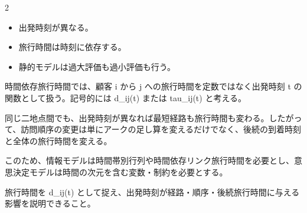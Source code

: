 \clearpage



\vspace{1.5mm}

\begin{multicols}{2}

\footnotesize

\raggedcolumns


\begin{itemize}
\item 出発時刻が異なる。
\item 旅行時間は時刻に依存する。
\item 静的モデルは過大評価も過小評価も行う。
\end{itemize}

時間依存旅行時間では、顧客 i から j への旅行時間を定数ではなく出発時刻 t の関数として扱う。記号的には d\_ij(t) または tau\_ij(t) と考える。\par

同じ二地点間でも、出発時刻が異なれば最短経路も旅行時間も変わる。したがって、訪問順序の変更は単にアークの足し算を変えるだけでなく、後続の到着時刻と全体の旅行時間を変える。\par

このため、情報モデルは時間帯別行列や時間依存リンク旅行時間を必要とし、意思決定モデルは時間の次元を含む変数・制約を必要とする。\par

旅行時間を d\_ij(t) として捉え、出発時刻が経路・順序・後続旅行時間に与える影響を説明できること。\par


\end{multicols}
